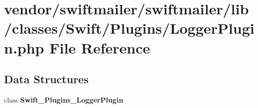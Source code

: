 \section{vendor/swiftmailer/swiftmailer/lib/classes/\+Swift/\+Plugins/\+Logger\+Plugin.php File Reference}
\label{_logger_plugin_8php}
\subsection*{Data Structures}
\begin{DoxyCompactItemize}
\item 
class {\bf Swift\+\_\+\+Plugins\+\_\+\+Logger\+Plugin}
\end{DoxyCompactItemize}

